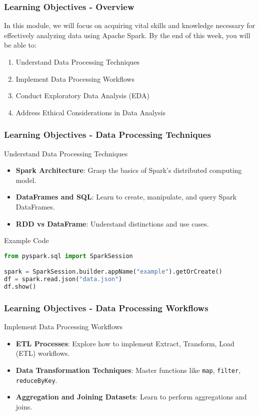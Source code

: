 \documentclass[aspectratio=169]{beamer}
\begin{document}
\begin{frame}[fragile]
    \frametitle{Learning Objectives - Overview}
    In this module, we will focus on acquiring vital skills and knowledge necessary for effectively analyzing data using Apache Spark. By the end of this week, you will be able to:
    \begin{enumerate}
        \item Understand Data Processing Techniques
        \item Implement Data Processing Workflows
        \item Conduct Exploratory Data Analysis (EDA)
        \item Address Ethical Considerations in Data Analysis
    \end{enumerate}
\end{frame}

\begin{frame}[fragile]
    \frametitle{Learning Objectives - Data Processing Techniques}
    \begin{block}{Understand Data Processing Techniques}
        \begin{itemize}
            \item \textbf{Spark Architecture}: Grasp the basics of Spark's distributed computing model.
            \item \textbf{DataFrames and SQL}: Learn to create, manipulate, and query Spark DataFrames.
            \item \textbf{RDD vs DataFrame}: Understand distinctions and use cases.
        \end{itemize}
    \end{block}
    \begin{block}{Example Code}
        \begin{lstlisting}[language=Python]
from pyspark.sql import SparkSession

spark = SparkSession.builder.appName("example").getOrCreate()
df = spark.read.json("data.json")
df.show()
        \end{lstlisting}
    \end{block}
\end{frame}

\begin{frame}[fragile]
    \frametitle{Learning Objectives - Data Processing Workflows}
    \begin{block}{Implement Data Processing Workflows}
        \begin{itemize}
            \item \textbf{ETL Processes}: Explore how to implement Extract, Transform, Load (ETL) workflows.
            \item \textbf{Data Transformation Techniques}: Master functions like \texttt{map}, \texttt{filter}, \texttt{reduceByKey}.
            \item \textbf{Aggregation and Joining Datasets}: Learn to perform aggregations and joins.
        \end{itemize}
    \end{block}
\end{frame}
\end{document}
